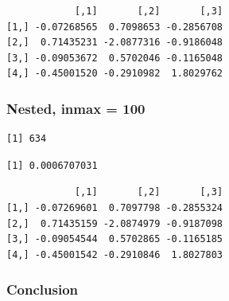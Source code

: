 \documentclass[
  12pt,
  letterpaper,
  DIV=11,
  numbers=noendperiod]{scrartcl}
\newenvironment{Shaded}{\begin{snugshade}}{\end{snugshade}}
\newcommand{\AttributeTok}[1]{\textcolor[rgb]{0.40,0.45,0.13}{#1}}
\newcommand{\ConstantTok}[1]{\textcolor[rgb]{0.56,0.35,0.01}{#1}}
\newcommand{\DecValTok}[1]{\textcolor[rgb]{0.68,0.00,0.00}{#1}}
\newcommand{\FunctionTok}[1]{\textcolor[rgb]{0.28,0.35,0.67}{#1}}
\newcommand{\NormalTok}[1]{\textcolor[rgb]{0.00,0.23,0.31}{#1}}
\newcommand{\OtherTok}[1]{\textcolor[rgb]{0.00,0.23,0.31}{#1}}
\newcommand{\SpecialCharTok}[1]{\textcolor[rgb]{0.37,0.37,0.37}{#1}}
\begin{document}
\begin{verbatim}
            [,1]       [,2]       [,3]
[1,] -0.07268565  0.7098653 -0.2856708
[2,]  0.71435231 -2.0877316 -0.9186048
[3,] -0.09053672  0.5702046 -0.1165048
[4,] -0.45001520 -0.2910982  1.8029762
\end{verbatim}

\subsubsection{Nested, inmax = 100}\label{nested-inmax-100}

\begin{Shaded}
\end{Shaded}

\begin{verbatim}
[1] 634
\end{verbatim}

\begin{Shaded}
\end{Shaded}

\begin{verbatim}
[1] 0.0006707031
\end{verbatim}

\begin{Shaded}
\end{Shaded}

\begin{verbatim}
            [,1]       [,2]       [,3]
[1,] -0.07269601  0.7097798 -0.2855324
[2,]  0.71435159 -2.0874979 -0.9187098
[3,] -0.09054544  0.5702865 -0.1165185
[4,] -0.45001542 -0.2910846  1.8027803
\end{verbatim}

\subsubsection{Conclusion}\label{conclusion}
\end{document}
